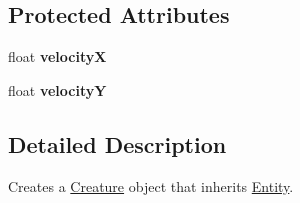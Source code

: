 \subsection*{Protected Attributes}
\begin{DoxyCompactItemize}
\item 
\hypertarget{class_creature_a6e857406fb17f893ebace230ff8aa05f}{float {\bfseries velocity\+X}}\label{class_creature_a6e857406fb17f893ebace230ff8aa05f}

\item 
\hypertarget{class_creature_a8a3cb01fd7b9d05372749fc9e04ab8dd}{float {\bfseries velocity\+Y}}\label{class_creature_a8a3cb01fd7b9d05372749fc9e04ab8dd}

\end{DoxyCompactItemize}


\subsection{Detailed Description}
Creates a \hyperlink{class_creature}{Creature} object that inherits \hyperlink{class_entity}{Entity}. 

